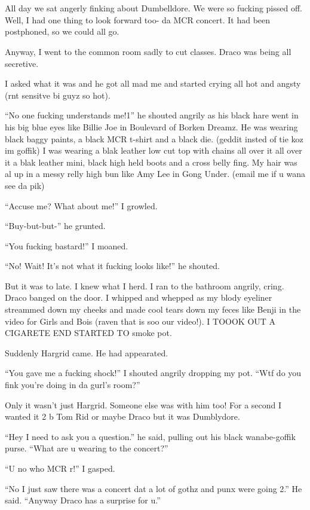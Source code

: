 \section[im nut ok i promise]{\protect{}}


\XXX{\Xfill 666\Xfill}

All day we sat angerly finking about Dumbelldore. We were so fucking pissed off. Well, I had one thing to look forward too- da MCR concert. It had been postphoned, so we could all go.

\begin{sloppypar}
    Anyway, I went to the common room sadly to cut classes. Draco was being all secretive.
\end{sloppypar}

I asked what it was and he got all mad me and started crying all hot and angsty (rnt sensitve bi guyz so hot).

\enquote{No one fucking understands me!1} he shouted angrily as his black hare went in his big blue eyes like Billie Joe in Boulevard of Borken Dreamz. He was wearing black baggy paints, a black MCR t-shirt and a black die. (geddit insted of tie koz im goffik) I was wearing a blak leather low cut top with chains all over it all over it a blak leather mini, black high held boots and a cross belly fing. My hair was al up in a messy relly high bun like Amy Lee in Gong Under. (email me if u wana see da pik)

\enquote{Accuse me? What about me!} I growled.

\enquote{Buy-but-but-} he grunted.

\enquote{You fucking bastard!} I moaned.

\enquote{No! Wait! It's not what it fucking looks like!} he shouted.

But it was to late. I knew what I herd. I ran to the bathroom angrily, cring. Draco banged on the door. I whipped and whepped as my blody eyeliner streammed down my cheeks and made cool tears down my feces like Benji in the video for Girls and Bois (raven that is soo our video!). I TOOOK OUT A CIGARETE END STARTED TO smoke pot.

Suddenly Hargrid came. He had appearated.

\enquote{You gave me a fucking shock!} I shouted angrily dropping my pot. \enquote{Wtf do you fink you're doing in da gurl's room?}

Only it wasn't just Hargrid. Someone else was with him too! For a second I wanted it 2 b Tom Rid or maybe Draco but it was Dumblydore.

\enquote{Hey I need to ask you a question.} he said, pulling out his black wanabe-goffik purse. \enquote{What are u wearing to the concert?}

\enquote{U no who MCR r!} I gasped.

\enquote{No I just saw there was a concert dat a lot of gothz and punx were going 2.} He said. \enquote{Anyway Draco has a surprise for u.}

